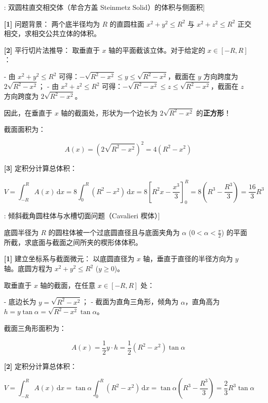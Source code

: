 \documentclass[11pt,a4paper,UTF8]{ctexart}
\begin{document}
\begin{thmbox}[模型[7]: 双圆柱直交相交体（牟合方盖 Steinmetz Solid）的体积与侧面积]

\textbf{[1]} 问题背景：
两个底半径均为 $R$ 的直圆柱面 $x^2 + y^2 \leqslant R^2$ 与 $x^2 + z^2 \leqslant R^2$ 正交相交，求相交公共立体的体积。

\textbf{[2]} 平行切片法推导：
取垂直于 $x$ 轴的平面截该立体。对于给定的 $x \in [-R, R]$：

- 由 $x^2 + y^2 \leqslant R^2$ 可得：$-\sqrt{R^2-x^2} \leqslant y \leqslant \sqrt{R^2-x^2}$，截面在 $y$ 方向跨度为 $2\sqrt{R^2-x^2}$；
- 由 $x^2 + z^2 \leqslant R^2$ 可得：$-\sqrt{R^2-x^2} \leqslant z \leqslant \sqrt{R^2-x^2}$，截面在 $z$ 方向跨度为 $2\sqrt{R^2-x^2}$。

因此，在垂直于 $x$ 轴的截面处，形状为一个边长为 $2\sqrt{R^2-x^2}$ 的\textbf{正方形}！

截面面积为：


\begin{equation*}
A(x) = \left(2\sqrt{R^2-x^2}\right)^2 = 4(R^2 - x^2)
\end{equation*}


\textbf{[3]} 定积分计算总体积：

\begin{equation*}
V = \int_{-R}^R A(x)\,\mathrm{d}x = 8 \int_0^R (R^2 - x^2)\,\mathrm{d}x = 8 \left[R^2 x - \frac{x^3}{3}\right]_0^R = 8 \left(R^3 - \frac{R^3}{3}\right) = \frac{16}{3}R^3
\end{equation*}


\end{thmbox}
\begin{thmbox}[模型[8]: 倾斜截角圆柱体与水槽切面问题（Cavalieri 楔体）]

底圆半径为 $R$ 的圆柱体被一个过底圆直径且与底面夹角为 $\alpha$ ($0 < \alpha < \frac{\pi}{2}$) 的平面所截，求底面与截面之间所夹的楔形体体积。

\textbf{[1]} 建立坐标系与截面微元：
以底圆直径为 $x$ 轴，垂直于直径的半径方向为 $y$ 轴。底圆方程为 $x^2 + y^2 \leqslant R^2$ ($y \geqslant 0$)。

取垂直于 $x$ 轴的截面，在任意 $x \in [-R, R]$ 处：

- 底边长为 $y = \sqrt{R^2 - x^2}$；
- 截面为直角三角形，倾角为 $\alpha$，直角高为 $h = y\tan\alpha = \sqrt{R^2-x^2}\tan\alpha$。

截面三角形面积为：


\begin{equation*}
A(x) = \frac{1}{2} y \cdot h = \frac{1}{2}(R^2 - x^2)\tan\alpha
\end{equation*}


\textbf{[2]} 定积分计算总体积：

\begin{equation*}
V = \int_{-R}^R A(x)\,\mathrm{d}x = \tan\alpha \int_0^R (R^2 - x^2)\,\mathrm{d}x = \tan\alpha \left(R^3 - \frac{R^3}{3}\right) = \frac{2}{3}R^3\tan\alpha
\end{equation*}


\end{thmbox}
\end{document}
